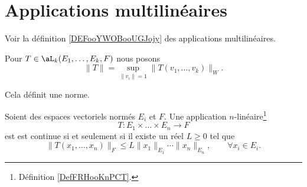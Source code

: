 
\section{Applications multilinéaires}

Voir la définition \ref{DEFooYWOBooUGJojy} des applications multilinéaires.
\begin{lemmaDef}  \label{DefKPBYeyG}
	Pour \( T\in \aL_k(E_1,\ldots,E_k,F)\) nous posons
	\begin{equation}
		\| T \|=\sup_{\| v_i \|=1}\| T(v_1,\ldots,v_k) \|_W.
	\end{equation}

	Cela définit une norme.
\end{lemmaDef}


\begin{proposition} \label{PropUADlSMg}
	Soient des espaces vectoriels normés \( E_i\) et \( F\). Une application \( n\)-linéaire\footnote{Définition \ref{DefFRHooKnPCT}.}
	\begin{equation}
		T\colon E_1\times\ldots\times E_n\to F
	\end{equation}
	est est continue si et seulement si il existe un réel \( L\geq 0\) tel que
	\begin{equation}\label{limitatezza}
		\|T(x_1, \ldots,x_n)\|_F\leq L \|x_1\|_{E_1}\cdots\|x_n\|_{E_n}, \qquad \forall x_i\in E_i.
	\end{equation}
\end{proposition}

